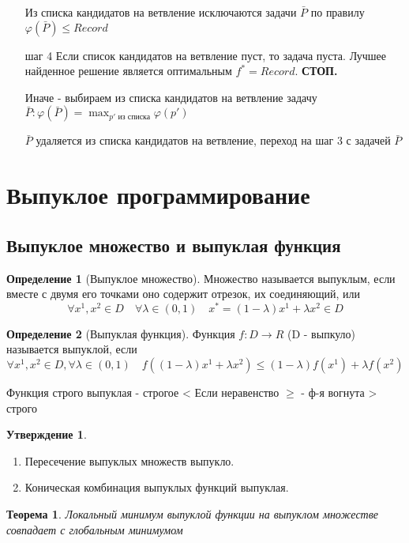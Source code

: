\documentclass[a4paper]{article}
\newtheorem{theorem}{Теорема}[section]
\theoremstyle{definition}
\newtheorem*{definition}{Определение}
\newtheorem*{statement}{Утверждение}
\theoremstyle{remark}
\begin{document}
\begin{enumerate}
    Из списка кандидатов на ветвление исключаются задачи $\bar{P}$ по правилу $\varphi(\bar{P})\le Record$
    \item [шаг 4]
    Если список кандидатов на ветвление пуст, то задача пуста. Лучшее найденное решение является оптимальным $f^* = Record$. \textbf{СТОП.}

    Иначе - выбираем из списка кандидатов на ветвление задачу $\bar {P}: \varphi(\bar{P}) = \max_{p' \text{ из списка}}\varphi(p')$

    $\bar{P}$ удаляется из списка кандидатов на ветвление, переход на шаг 3 с задачей $\bar{P}$
\end{enumerate}
\section{Выпуклое программирование}
\subsection{Выпуклое множество и выпуклая функция}
\begin{definition}[Выпуклое множество]
    Множество называется выпуклым, если вместе с двумя его точками оно содержит отрезок, их соединяющий, или 
    \[\forall x^1, x^2 \in D \quad \forall \lambda \in (0, 1) \quad 
    x^* = (1 - \lambda)x^1 + \lambda x^2 \in D\]
\end{definition}
\begin{definition}[Выпуклая функция]
    Функция $f:D\to R$ (D - выпкуло) называется выпуклой, если 
    \[\forall x^1, x^2 \in D, \forall \lambda \in (0, 1) \quad f((1-\lambda)x^1 +\lambda x^2) \le
    (1-\lambda)f(x^1) + \lambda f(x^2)\]
\end{definition}
Функция строго выпуклая - строгое <
Если неравенство $\ge$ - ф-я вогнута
> строго
\begin{statement}
    \begin{enumerate}
        \item Пересечение выпуклых множеств выпукло.
        \item Коническая комбинация выпуклых функций выпуклая.
    \end{enumerate}
\end{statement}
\begin{theorem}
    Локальный минимум выпуклой функции на выпуклом множестве совпадает с глобальным минимумом
\end{theorem}
\end{document}
